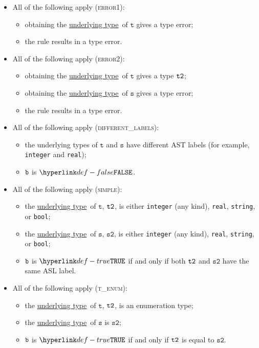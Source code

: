 \documentclass{book}
\newcommand\underlyingtype[0]{\hyperlink{def-underlyingtype}{underlying type}}
\newcommand\vt[0]{\texttt{t}}
\newcommand\vs[0]{\texttt{s}}
\newcommand\vstwo[0]{\texttt{s2}}
\begin{document}
\begin{itemize}
\item All of the following apply (\textsc{error1}):
  \begin{itemize}
  \item obtaining the \underlyingtype\ of $\vt$ gives a type error;
  \item the rule results in a type error.
  \end{itemize}

\item All of the following apply (\textsc{error2}):
  \begin{itemize}
    \item obtaining the \underlyingtype\ of $\vt$ gives a type $\texttt{t2}$;
    \item obtaining the \underlyingtype\ of $\vs$ gives a type error;
    \item the rule results in a type error.
    \end{itemize}

\item All of the following apply (\textsc{different\_labels}):
  \begin{itemize}
  \item the underlying types of $\vt$ and $\vs$ have different AST labels
  (for example, \texttt{integer} and \texttt{real});
  \item $\texttt{b}$ is $\False$.
  \end{itemize}

\item All of the following apply (\textsc{simple}):
  \begin{itemize}
  \item the \underlyingtype\ of $\vt$, $\texttt{t2}$, is either \texttt{integer} (any kind), \texttt{real}, \texttt{string}, or \texttt{bool};
  \item the \underlyingtype\ of $\vs$, $\vstwo$, is either \texttt{integer} (any kind), \texttt{real}, \texttt{string}, or \texttt{bool};
  \item $\texttt{b}$ is $\True$ if and only if both $\texttt{t2}$ and $\vstwo$ have the same ASL label.
  \end{itemize}

\item All of the following apply (\textsc{t\_enum}):
  \begin{itemize}
  \item the \underlyingtype\ of $\vt$, $\texttt{t2}$, is an enumeration type;
  \item the \underlyingtype\ of $\vs$ is $\vstwo$;
  \item $\texttt{b}$ is $\True$ if and only if $\texttt{t2}$ is equal to $\vstwo$.
  \end{itemize}


\end{itemize}
\end{document}
